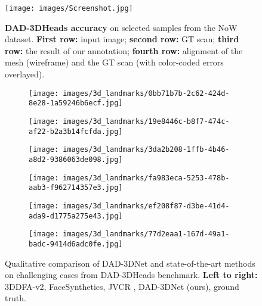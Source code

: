 \documentclass[10pt,twocolumn,letterpaper]{article}
\begin{document}
\begin{figure*}[t!]\centering
  \texttt{[image: images/Screenshot.jpg]}
  \vspace{1mm}
  \caption{\textbf{DAD-3DHeads accuracy} on selected samples from the NoW dataset. \textbf{First row:} input image; \textbf{second row:} GT scan; \textbf{third row:} the result of our annotation; \textbf{fourth row:} alignment of the mesh (wireframe) and the GT scan (with color-coded errors overlayed). 
}
\label{fig:now_scans_vs_GT_big}
\end{figure*}

\begin{figure*}[t]\centering
    \begin{subfigure}[t]{0.85\textwidth}
        \texttt{[image: images/3d\_landmarks/0bb71b7b-2c62-424d-8e28-1a59246b6ecf.jpg]}
    \end{subfigure}
    \begin{subfigure}[t]{0.85\textwidth}
        \texttt{[image: images/3d\_landmarks/19e8446c-b8f7-474c-af22-b2a3b14fcfda.jpg]}
    \end{subfigure}
    \begin{subfigure}[t]{0.85\textwidth}
        \texttt{[image: images/3d\_landmarks/3da2b208-1ffb-4b46-a8d2-9386063de098.jpg]}
    \end{subfigure}
    \begin{subfigure}[t]{0.85\textwidth}
        \texttt{[image: images/3d\_landmarks/fa983eca-5253-478b-aab3-f962714357e3.jpg]}
    \end{subfigure}
        \begin{subfigure}[t]{0.85\textwidth}
        \texttt{[image: images/3d\_landmarks/ef208f87-d3be-41d4-ada9-d1775a275e43.jpg]}
    \end{subfigure}
        \begin{subfigure}[t]{0.85\textwidth}
        \texttt{[image: images/3d\_landmarks/77d2eaa1-167d-49a1-badc-9414d6adc0fe.jpg]}
    \end{subfigure}
\caption{Qualitative comparison of DAD-3DNet  and state-of-the-art methods on challenging cases from DAD-3DHeads benchmark. \textbf{Left to right:} 3DDFA-v2\cite{guo2020towards}, FaceSynthetics\cite{wood2021fake}, JVCR \cite{jvcr}, DAD-3DNet (ours), ground truth.}
\vspace{-1em}
\label{fig:3d_landmarks_dad_a}
\end{figure*}\begin{figure*}[t]\ContinuedFloat
            \centering


\end{figure*}
\end{document}
